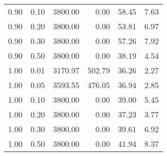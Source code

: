 \begin{table}
\begin{tabular}{rrrrrr}
0.90 & 0.10 & 3800.00 & 0.00 & 58.45 & 7.63 \\
0.90 & 0.20 & 3800.00 & 0.00 & 53.81 & 6.97 \\
0.90 & 0.30 & 3800.00 & 0.00 & 57.26 & 7.92 \\
0.90 & 0.50 & 3800.00 & 0.00 & 38.19 & 4.54 \\
1.00 & 0.01 & 3170.97 & 502.79 & 36.26 & 2.27 \\
1.00 & 0.05 & 3593.55 & 476.05 & 36.94 & 2.85 \\
1.00 & 0.10 & 3800.00 & 0.00 & 39.00 & 5.45 \\
1.00 & 0.20 & 3800.00 & 0.00 & 37.23 & 3.77 \\
1.00 & 0.30 & 3800.00 & 0.00 & 39.61 & 6.92 \\
1.00 & 0.50 & 3800.00 & 0.00 & 41.94 & 8.37 \\
\bottomrule
\end{tabular}
\end{table}
